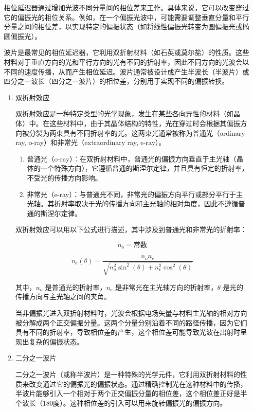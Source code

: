相位延迟器通过增加光波不同分量间的相位差来工作。具体来说，它可以改变穿过它的偏振光的相位关系。例如，在一个偏振光波中，可能需要调整垂直分量和平行分量之间的相位差，以实现特定的偏振状态（如将线性偏振光转变为圆偏振光或椭圆偏振光）。

波片是最常见的相位延迟器，它利用双折射材料（如石英或莫尔盐）的性质。这些材料对于垂直方向的光和平行方向的光有不同的折射率，因此不同方向的光波会以不同的速度传播，从而产生相位延迟。波片通常被设计成产生半波长（半波片）或四分之一波长（四分之一波片）的相位差，分别用于实现不同的偏振转换。

\begin{enumerate}
	\item 双折射效应
	
	双折射效应是一种特定类型的光学现象，发生在某些各向异性的材料（如晶体）中。在这些材料中，由于其晶体结构的特性，光在穿过时会根据其偏振方向被分裂为两束具有不同折射率的光。这两束光通常被称为普通光（ordinary ray, o-ray）和非常光（extraordinary ray, e-ray）。
	
	\begin{enumerate}
		\item 普通光（o-ray）：在双折射材料中，普通光的偏振方向垂直于主光轴（晶体的一个特殊方向），它遵循普通的斯涅尔定律，并且具有恒定的折射率，不受光的传播方向影响。
		
		\item 非常光（e-ray）：与普通光不同，非常光的偏振方向平行或部分平行于主光轴。其折射率取决于光的传播方向和主光轴的相对角度，因此不遵循普通的斯涅尔定律。
	\end{enumerate}
	
	双折射效应可以用以下公式进行描述，其中涉及到普通光和非常光的折射率：
	
	\[
	n_o = \text{常数}
	\]
	
	\[
	n_e(\theta) = \frac{n_o n_e}{\sqrt{n_o^2 \sin^2(\theta) + n_e^2 \cos^2(\theta)}}
	\]
	
	其中，\(n_o\) 是普通光的折射率，\(n_e\) 是非常光在主光轴方向的折射率，\(\theta\) 是光的传播方向与主光轴之间的夹角。
	
	当非偏振光进入双折射材料时，光波会根据电场矢量与材料主光轴的相对方向被分解成两个正交偏振分量。这两个分量分别沿着不同的路径传播，因为它们具有不同的折射率，导致相位差的产生，这个相位差可能导致光波在出射时呈现出复杂的偏振状态。		
	
	\item 二分之一波片
	
	二分之一波片（或称半波片）是一种特殊的光学元件，它利用双折射材料的性质来改变通过它的偏振光的偏振状态。通过精确控制光在这种材料中的传播，半波片能够引入一个相对于两个正交偏振分量的相位差，这个相位差正好是半个波长（180度）。这种相位差的引入可以用来旋转偏振光的偏振方向。
	

\end{enumerate}
